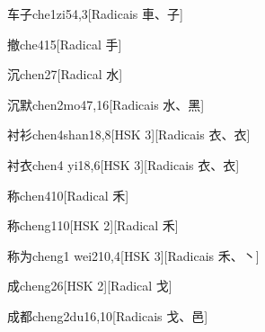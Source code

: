 \begin{entry}{车子}{che1zi5}{4,3}[Radicais ⾞、⼦]
\end{entry}

\begin{entry}{撤}{che4}{15}[Radical ⼿]
\end{entry}

\begin{entry}{沉}{chen2}{7}[Radical ⽔]
\end{entry}

\begin{entry}{沉默}{chen2mo4}{7,16}[Radicais ⽔、⿊]
\end{entry}

\begin{entry}{衬衫}{chen4shan1}{8,8}[HSK 3][Radicais ⾐、⾐]
\end{entry}

\begin{entry}{衬衣}{chen4 yi1}{8,6}[HSK 3][Radicais ⾐、⾐]
\end{entry}

\begin{entry}{称}{chen4}{10}[Radical ⽲]
\end{entry}

\begin{entry}{称}{cheng1}{10}[HSK 2][Radical ⽲]
\end{entry}

\begin{entry}{称为}{cheng1 wei2}{10,4}[HSK 3][Radicais ⽲、⼂]
\end{entry}

\begin{entry}{成}{cheng2}{6}[HSK 2][Radical ⼽]
\end{entry}

\begin{entry}{成都}{cheng2du1}{6,10}[Radicais ⼽、⾢]
\end{entry}

